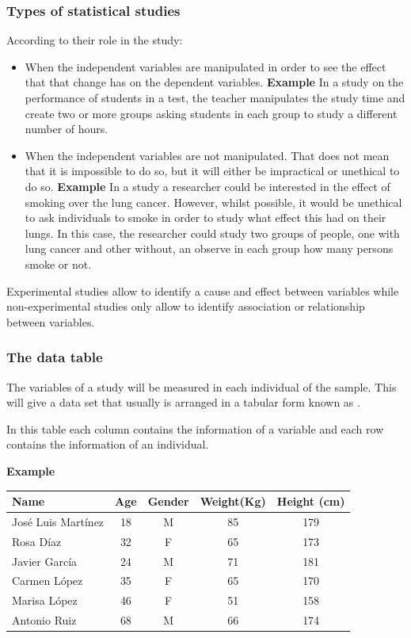\begin{frame}
\frametitle{Types of statistical studies}
According to their role in the study:
\begin{itemize}
\item {} When the independent variables are manipulated in order to see the effect that that change has on the dependent variables.\newline
\textbf{Example} In a study on the performance of students in a test, the teacher manipulates the study time and create two or more groups asking students in each group to study a different number of hours. 
\item {} When the independent variables are not manipulated. That does not mean that it is
impossible to do so, but it will either be impractical or unethical to do so.\newline
\textbf{Example} In a study a researcher could be interested in the effect of smoking over the lung
cancer. 
However, whilst possible, it would be unethical to ask individuals to smoke in order to study what effect this had on
their lungs. In this case, the researcher could study two groups of people, one with lung cancer and other
without, an observe in each group how many persons smoke or not. 
\end{itemize}

Experimental studies allow to identify a cause and effect between variables while non-experimental studies
only allow to identify association or relationship between variables. 
\end{frame}


\begin{frame}
\frametitle{The data table}
The variables of a study will be measured in each individual of the sample. 
This will give a data set that usually is arranged in a tabular form known as .

In this table each column contains the information of a variable and each row contains the information of an individual. 

\textbf{Example}
\begin{center}
\begin{tabular}{|l|c|c|c|c|}
\hline
Name & Age & Gender & Weight(Kg) & Height (cm)\\
\hline
José Luis Martínez & 18 & M &  85 & 179 \\
Rosa Díaz & 32 & F & 65 & 173 \\
Javier García & 24 & M & 71 & 181 \\
Carmen López & 35 & F &  65 & 170 \\
Marisa López  & 46 & F &  51 & 158 \\
Antonio Ruiz & 68 & M & 66 & 174 \\
\hline
\end{tabular}
\end{center}
\end{frame}


